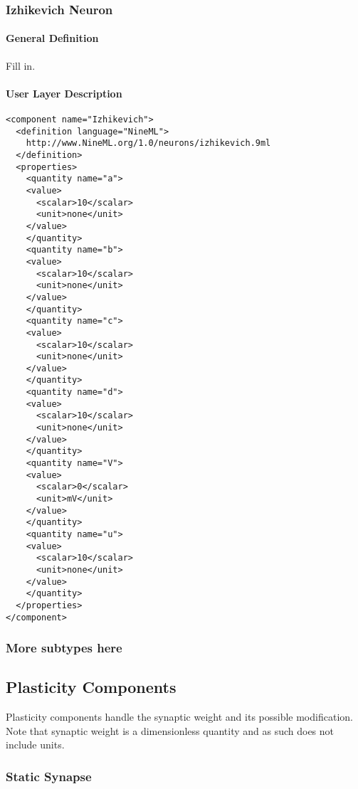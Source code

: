 \documentclass{article}
\begin{document}
\subsubsection{Izhikevich Neuron}

\paragraph{General Definition}
Fill in.

\paragraph{User Layer Description}
\begin{verbatim}
<component name="Izhikevich">
  <definition language="NineML">
    http://www.NineML.org/1.0/neurons/izhikevich.9ml
  </definition>
  <properties>
    <quantity name="a">
    <value>
      <scalar>10</scalar>
      <unit>none</unit>
    </value>
    </quantity>
    <quantity name="b">
    <value>
      <scalar>10</scalar>
      <unit>none</unit>
    </value>
    </quantity>
    <quantity name="c">
    <value>
      <scalar>10</scalar>
      <unit>none</unit>
    </value>
    </quantity>
    <quantity name="d">
    <value>
      <scalar>10</scalar>
      <unit>none</unit>
    </value>
    </quantity>
    <quantity name="V">
    <value>
      <scalar>0</scalar>
      <unit>mV</unit>
    </value>
    </quantity>
    <quantity name="u">
    <value>
      <scalar>10</scalar>
      <unit>none</unit>
    </value>
    </quantity>
  </properties>
</component>
\end{verbatim}

\subsubsection{More subtypes here}

\subsection{Plasticity Components}
\label{plasticity}

Plasticity components handle the synaptic weight and its possible modification.
Note that synaptic weight is a dimensionless quantity and as such does not
include units.

\subsubsection{Static Synapse}
\end{document}
